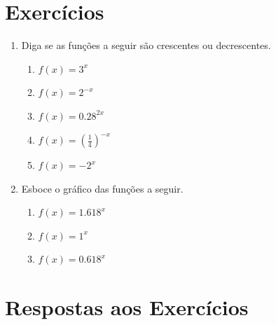 \documentclass[11pt]{article}
\begin{document}
\section{Exercícios}
\begin{enumerate}
	\item Diga se as funções a seguir são crescentes ou decrescentes.
	\begin{enumerate}
		\item $f(x) = 3^x$
		\item $f(x) = 2^{-x}$
		\item $f(x) = {0.28}^{2x}$
		\item $f(x) = {\left(\frac{1}{4}\right)}^{-x}$
		\item $f(x) = -2^x$
	\end{enumerate}

	\item Esboce o gráfico das funções a seguir.
	\begin{enumerate}
		\item $f(x) = {1.618}^x$
		\item $f(x) = 1^x$
		\item $f(x) = {0.618}^x$
	\end{enumerate}
\end{enumerate}

\newpage{}

\section{Respostas aos Exercícios}
\end{document}
